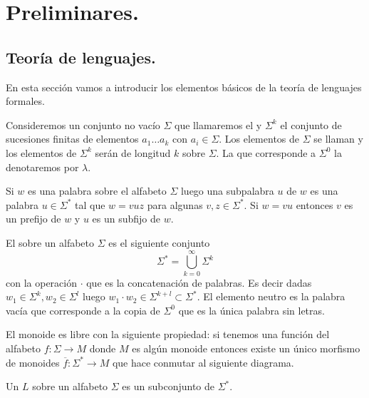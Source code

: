 \documentclass[tesis.tex]{subfiles}
\begin{document}
\chapter{Preliminares.}
\section{Teoría de lenguajes.}	
En esta sección vamos a introducir los elementos básicos de la teoría de lenguajes formales. 

Consideremos un conjunto no vacío $\Sigma$ que llamaremos el  y $\Sigma^k$ el conjunto de sucesiones finitas de elementos $a_1 \dots a_k$ con  $a_i \in \Sigma$. Los elementos de $\Sigma$ se llaman  y los elementos de $\Sigma^k$ serán  de longitud $k$ sobre $\Sigma$. La  que corresponde a $\Sigma^0$ la denotaremos por $\lambda$.


Si $w$ es una palabra sobre el alfabeto $\Sigma$ luego una subpalabra $u$ de $w$ es una palabra $u \in \Sigma^*$ tal que $w = vuz$ para algunas $v, z \in \Sigma^*$. Si $w = vu$ entonces $v$ es un prefijo de $w$ y $u$ es un subfijo de $w$.


\begin{deff}
	El  sobre un alfabeto $\Sigma$ es el siguiente conjunto
	\begin{equation*}
	\Sigma^{*} = \bigcup_{k=0}^{\infty} \Sigma^k
	\end{equation*}
	con la operación $\cdot$ que es la concatenación de palabras. 
	Es decir dadas $w_1 \in \Sigma^{k}, w_2 \in \Sigma^{l}$ luego $w_1 \cdot w_2 \in \Sigma^{k+l} \subset \Sigma^*$. El elemento neutro es la palabra vacía que corresponde a la copia de $\Sigma^0$ que es la única palabra sin letras. 
\end{deff}
\begin{obs}
	El monoide es libre con la siguiente propiedad: si tenemos una función del alfabeto $f: \Sigma \to M$ donde $M$ es algún monoide entonces existe un único morfismo de monoides $\overline f: \Sigma^{*} \to M$ que hace conmutar al siguiente diagrama.	
	
	\begin{center}
	\end{center}
	
\end{obs}
\begin{deff}
	Un  $L$ sobre un alfabeto $\Sigma$ es un subconjunto de $\Sigma^*$.
\end{deff}
\end{document}
